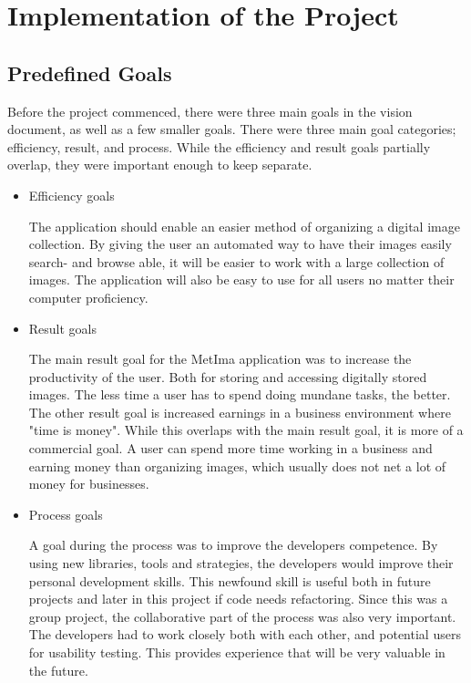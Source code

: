 \section{Implementation of the Project}
    \subsection{Predefined Goals}
        Before the project commenced, there were three main goals in the vision document, as well as a few smaller goals. There were three main goal categories; efficiency, result, and process. While the efficiency and result goals partially overlap, they were important enough to keep separate.
 
    \begin{itemize}
        \item Efficiency goals
  
        The application should enable an easier method of organizing a digital image collection. By giving the user an automated way to have their images easily search- and browse able, it will be easier to work with a large collection of images. The application will also be easy to use for all users no matter their computer proficiency. 
        
        \item Result goals
  
        The main result goal for the MetIma application was to increase the productivity of the user. Both for storing and accessing digitally stored images. The less time a user has to spend doing mundane tasks, the better. The other result goal is increased earnings in a business environment where "time is money". While this overlaps with the main result goal, it is more of a commercial goal. A user can spend more time working in a business and earning money than organizing images, which usually does not net a lot of money for businesses. 
    
        \item Process goals
  
        A goal during the process was to improve the developers competence. By using new libraries, tools and strategies, the developers would improve their personal development skills. This newfound skill is useful both in future projects and later in this project if code needs refactoring. Since this was a group project, the collaborative part of the process was also very important. The developers had to work closely both with each other, and potential users for usability testing. This provides experience that will be very valuable in the future. 
    \end{itemize}
  
